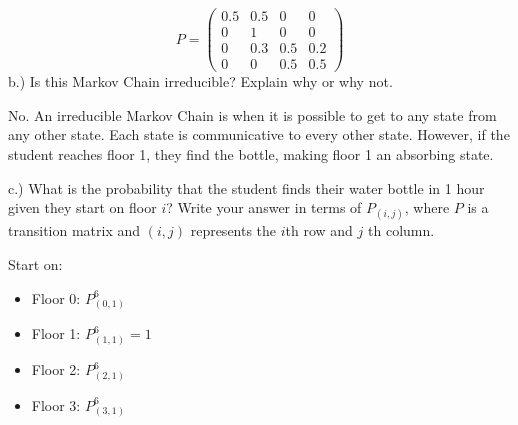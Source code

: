 \documentclass{report}
\begin{document}


\[
P = \begin{pmatrix} 
0.5 & 0.5 & 0 & 0 \\ 
0 & 1 & 0 & 0 \\ 
0 & 0.3 & 0.5 & 0.2 \\ 
0 & 0 & 0.5 & 0.5 
\end{pmatrix}
\]
b.) Is this Markov Chain irreducible? Explain why or why not. 

No. An irreducible Markov Chain is when it is possible to get to any state from any other state. Each state is communicative to every other state. However, if the student reaches floor 1, they find the bottle, making floor 1 an absorbing state. 


c.) What is the probability that the student finds their water bottle in 1 hour given they start on floor $ i $? Write your answer in terms of $ P_{(i,j)} $, where $ P $ is a transition matrix and $ (i,j) $ represents the $ i $th row and $ j $ th column. 

Start on:
\begin{itemize}
	\item Floor 0: $ P^{6}_{(0,1)} $ 
	\item Floor 1: $ P^{6}_{(1,1)} = 1 $ 
	\item Floor 2: $ P^{6}_{(2,1)} $ 
	\item Floor 3: $ P^{6}_{(3,1)} $ 
\end{itemize}
\end{document}
